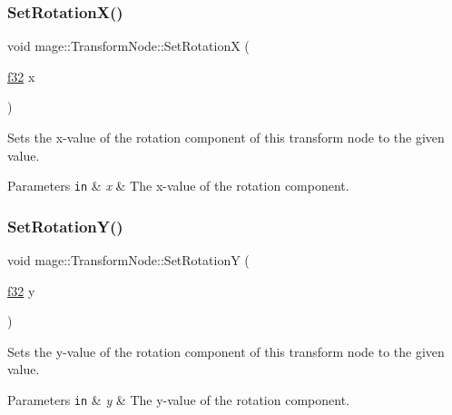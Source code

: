 \subsubsection{\texorpdfstring{Set\+Rotation\+X()}{SetRotationX()}}
{\footnotesize\ttfamily void mage\+::\+Transform\+Node\+::\+Set\+RotationX (\begin{DoxyParamCaption}\item[{\hyperlink{namespacemage_a6a44ad388483959dc4dff9f2aef91431}{f32}}]{x }\end{DoxyParamCaption})\hspace{0.3cm}{\ttfamily [noexcept]}}

Sets the x-\/value of the rotation component of this transform node to the given value.


\begin{DoxyParams}[1]{Parameters}
\mbox{\tt in}  & {\em x} & The x-\/value of the rotation component. \\
\hline
\end{DoxyParams}
\hypertarget{structmage_1_1_transform_node_ae117a889122ecdb4f7e16a78f240c7c6}{}\label{structmage_1_1_transform_node_ae117a889122ecdb4f7e16a78f240c7c6} 
\subsubsection{\texorpdfstring{Set\+Rotation\+Y()}{SetRotationY()}}
{\footnotesize\ttfamily void mage\+::\+Transform\+Node\+::\+Set\+RotationY (\begin{DoxyParamCaption}\item[{\hyperlink{namespacemage_a6a44ad388483959dc4dff9f2aef91431}{f32}}]{y }\end{DoxyParamCaption})\hspace{0.3cm}{\ttfamily [noexcept]}}

Sets the y-\/value of the rotation component of this transform node to the given value.


\begin{DoxyParams}[1]{Parameters}
\mbox{\tt in}  & {\em y} & The y-\/value of the rotation component. \\
\hline
\end{DoxyParams}
\hypertarget{structmage_1_1_transform_node_a2fe3254e45a9ab3a7513f2162bd17c7f}{}\label{structmage_1_1_transform_node_a2fe3254e45a9ab3a7513f2162bd17c7f} 
